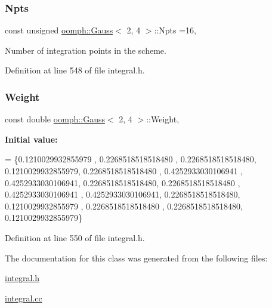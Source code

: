 \subsubsection{\texorpdfstring{Npts}{Npts}}
{\footnotesize\ttfamily const unsigned \hyperlink{classoomph_1_1Gauss}{oomph\+::\+Gauss}$<$ 2, 4 $>$\+::Npts =16\hspace{0.3cm}{\ttfamily [static]}, {\ttfamily [private]}}



Number of integration points in the scheme. 



Definition at line 548 of file integral.\+h.

\mbox{\label{classoomph_1_1Gauss_3_012_00_014_01_4_a1aa1e00414fe956b89da132ebfc30449}} 
\subsubsection{\texorpdfstring{Weight}{Weight}}
{\footnotesize\ttfamily const double \hyperlink{classoomph_1_1Gauss}{oomph\+::\+Gauss}$<$ 2, 4 $>$\+::Weight\hspace{0.3cm}{\ttfamily [static]}, {\ttfamily [private]}}

{\bfseries Initial value\+:}
\begin{DoxyCode}
= 
\{0.1210029932855979 , 0.2268518518518480 , 0.2268518518518480, 0.1210029932855979,  
 0.2268518518518480 , 0.4252933030106941 , 0.4252933030106941, 0.2268518518518480,
 0.2268518518518480 , 0.4252933030106941 , 0.4252933030106941, 0.2268518518518480,
 0.1210029932855979 , 0.2268518518518480 , 0.2268518518518480, 0.1210029932855979\}
\end{DoxyCode}


Definition at line 550 of file integral.\+h.



The documentation for this class was generated from the following files\+:\begin{DoxyCompactItemize}
\item 
\hyperlink{integral_8h}{integral.\+h}\item 
\hyperlink{integral_8cc}{integral.\+cc}\end{DoxyCompactItemize}

